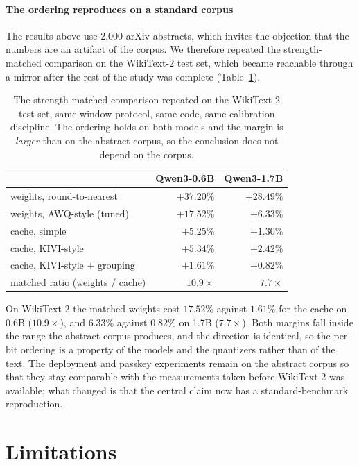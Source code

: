 \documentclass[10pt,journal]{IEEEtran}
\begin{document}
\paragraph*{The ordering reproduces on a standard corpus}
The results above use 2{,}000 arXiv abstracts, which invites the objection that the
numbers are an artifact of the corpus. We therefore repeated the strength-matched
comparison on the WikiText-2 test set, which became reachable through a mirror
after the rest of the study was complete (Table~\ref{tab:wikitext}).

\begin{table}[t]
\centering
\caption{The strength-matched comparison repeated on the WikiText-2 test set, same
window protocol, same code, same calibration discipline. The ordering holds on both
models and the margin is \emph{larger} than on the abstract corpus, so the
conclusion does not depend on the corpus.}
\label{tab:wikitext}
\begin{tabular}{lrr}
\toprule
 & Qwen3-0.6B & Qwen3-1.7B \\
\midrule
weights, round-to-nearest & $+37.20\%$ & $+28.49\%$ \\
weights, AWQ-style (tuned) & $+17.52\%$ & $+6.33\%$ \\
cache, simple & $+5.25\%$ & $+1.30\%$ \\
cache, KIVI-style & $+5.34\%$ & $+2.42\%$ \\
cache, KIVI-style + grouping & $\mathbf{+1.61\%}$ & $\mathbf{+0.82\%}$ \\
\midrule
matched ratio (weights / cache) & $10.9\times$ & $7.7\times$ \\
\bottomrule
\end{tabular}
\end{table}

On WikiText-2 the matched weights cost $17.52\%$ against $1.61\%$ for the cache on
0.6B ($10.9\times$), and $6.33\%$ against $0.82\%$ on 1.7B ($7.7\times$). Both
margins fall inside the range the abstract corpus produces, and the direction is
identical, so the per-bit ordering is a property of the models and the quantizers
rather than of the text. The deployment and passkey experiments remain on the
abstract corpus so that they stay comparable with the measurements taken before
WikiText-2 was available; what changed is that the central claim now has a
standard-benchmark reproduction.

\section{Limitations}
\label{sec:limitations}
\end{document}
